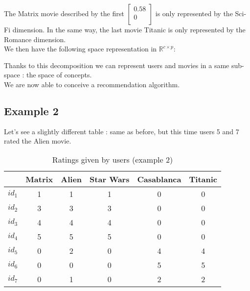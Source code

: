 \documentclass{article}
\begin{document}
\begin{itemize}
    The Matrix movie described by the first $\begin{bmatrix} 0.58\\ 0\\\end{bmatrix}$ is only represented by the Sci-Fi dimension. In the same way, the last movie Titanic is only represented by the Romance dimension.\\

    We then have the following space representation in $\mathbb{R}^{c \times p}$:
\begin{center}
\end{center}
\end{itemize}

Thanks to this decomposition we can represent users and movies in a same sub-space : the space of concepts.\\

We are now able to conceive a recommendation algorithm.

\subsection{Example 2}

Let's see a slightly different table : same as before, but this time users 5 and 7 rated the Alien movie.

\begin{table}[h]
    \centering
    \caption{Ratings given by users (example 2)}
    \label{tab:ratings_users_2}
    \begin{tabular}{|c|c|c|c|c|c|}
        \hline
        \textbf{} & \textbf{Matrix} & \textbf{Alien} & \textbf{Star Wars} & \textbf{Casablanca} & \textbf{Titanic} \\
        \hline
        $id_1$ & 1 & 1 & 1 & 0 & 0\\
        $id_2$ & 3 & 3 & 3 & 0 & 0\\
        $id_3$ & 4 & 4 & 4 & 0 & 0\\
        $id_4$ & 5 & 5 & 5 & 0 & 0\\
        $id_5$ & 0 & 2 & 0 & 4 & 4\\
        $id_6$ & 0 & 0 & 0 & 5 & 5\\
        $id_7$ & 0 & 1 & 0 & 2 & 2\\
        \hline
    \end{tabular}
\end{table}
\end{document}
